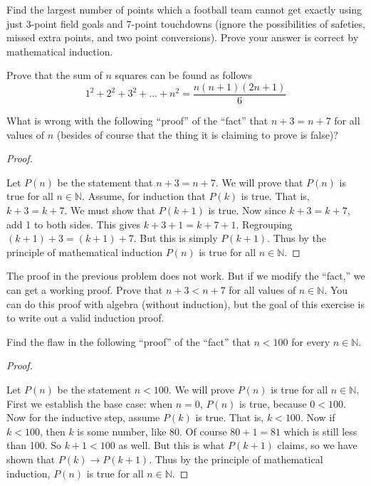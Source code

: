 \documentclass[10pt,]{book}
\theoremstyle{plain}
\theoremstyle{definition}
\theoremstyle{definition}
\theoremstyle{definition}
\theoremstyle{definition}
\numberwithin{equation}{chapter}
\def\N{\mathbb N}
\def\imp{\rightarrow}
\newcommand{\lt}{<}
\begin{document}
\begin{divisionexercise}{8}\hypertarget{exercise-263}{}
\hypertarget{p-2176}{}%
Find the largest number of points which a football team cannot get exactly using just 3-point field goals and 7-point touchdowns (ignore the possibilities of safeties, missed extra points, and two point conversions). Prove your answer is correct by mathematical induction.%
\end{divisionexercise}%
\begin{divisionexercise}{9}\hypertarget{exercise-264}{}
\hypertarget{p-2183}{}%
Prove that the sum of \(n\) squares can be found as follows%
\begin{equation*}
1^2 +2^2 +3^2+...+n^2 = \frac{n(n+1)(2n+1)}{6}
\end{equation*}
%
\end{divisionexercise}%
\begin{divisionexercise}{10}\hypertarget{exercise-265}{}
\hypertarget{p-2191}{}%
What is wrong with the following ``proof'' of the ``fact'' that \(n+3 = n+7\) for all values of \(n\) (besides of course that the thing it is claiming to prove is false)?%
\begin{proof}\hypertarget{proof-49}{}
\hypertarget{p-2192}{}%
Let \(P(n)\) be the statement that \(n + 3 = n + 7\). We will prove that \(P(n)\) is true for all \(n \in \N\). Assume, for induction that \(P(k)\) is true. That is, \(k+3 = k+7\). We must show that \(P(k+1)\) is true. Now since \(k + 3 = k + 7\), add 1 to both sides. This gives \(k + 3 + 1 = k + 7 + 1\). Regrouping \((k+1) + 3 = (k+1) + 7\). But this is simply \(P(k+1)\). Thus by the principle of mathematical induction \(P(n)\) is true for all \(n \in \N\).%
\end{proof}
\end{divisionexercise}%
\begin{divisionexercise}{11}\hypertarget{exercise-266}{}
\hypertarget{p-2194}{}%
The proof in the previous problem does not work. But if we modify the ``fact,'' we can get a working proof. Prove that \(n + 3 \lt  n + 7\) for all values of \(n \in \N\). You can do this proof with algebra (without induction), but the goal of this exercise is to write out a valid induction proof.%
\end{divisionexercise}%
\begin{divisionexercise}{12}\hypertarget{exercise-267}{}
\hypertarget{p-2196}{}%
Find the flaw in the following ``proof'' of the ``fact'' that \(n \lt  100\) for every \(n \in \N\).%
\begin{proof}\hypertarget{proof-51}{}
\hypertarget{p-2197}{}%
Let \(P(n)\) be the statement \(n \lt  100\). We will prove \(P(n)\) is true for all \(n \in \N\). First we establish the base case: when \(n = 0\), \(P(n)\) is true, because \(0 \lt  100\). Now for the inductive step, assume \(P(k)\) is true. That is, \(k \lt  100\). Now if \(k \lt  100\), then \(k\) is some number, like 80. Of course \(80+1 = 81\) which is still less than 100. So \(k +1 \lt  100\) as well. But this is what \(P(k+1)\) claims, so we have shown that \(P(k) \imp P(k+1)\). Thus by the principle of mathematical induction, \(P(n)\) is true for all \(n \in \N\).%
\end{proof}
\end{divisionexercise}%
\end{document}
